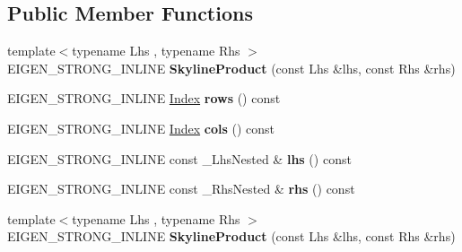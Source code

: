 \subsection*{Public Member Functions}
\begin{DoxyCompactItemize}
\item 
\mbox{\label{class_eigen_1_1internal_1_1_skyline_product_aa4773b15b610d5410545a055c3f5d767}} 
{\footnotesize template$<$typename Lhs , typename Rhs $>$ }\\E\+I\+G\+E\+N\+\_\+\+S\+T\+R\+O\+N\+G\+\_\+\+I\+N\+L\+I\+NE {\bfseries Skyline\+Product} (const Lhs \&lhs, const Rhs \&rhs)
\item 
\mbox{\label{class_eigen_1_1internal_1_1_skyline_product_a0343228278bf1d88bf6c60e913aaa581}} 
E\+I\+G\+E\+N\+\_\+\+S\+T\+R\+O\+N\+G\+\_\+\+I\+N\+L\+I\+NE \hyperlink{namespace_eigen_a62e77e0933482dafde8fe197d9a2cfde}{Index} {\bfseries rows} () const
\item 
\mbox{\label{class_eigen_1_1internal_1_1_skyline_product_a24f6dc6ce8c91000313bf2dc25fa59cc}} 
E\+I\+G\+E\+N\+\_\+\+S\+T\+R\+O\+N\+G\+\_\+\+I\+N\+L\+I\+NE \hyperlink{namespace_eigen_a62e77e0933482dafde8fe197d9a2cfde}{Index} {\bfseries cols} () const
\item 
\mbox{\label{class_eigen_1_1internal_1_1_skyline_product_a76802d63b2c608d33dcfa0c658b2e5c5}} 
E\+I\+G\+E\+N\+\_\+\+S\+T\+R\+O\+N\+G\+\_\+\+I\+N\+L\+I\+NE const \+\_\+\+Lhs\+Nested \& {\bfseries lhs} () const
\item 
\mbox{\label{class_eigen_1_1internal_1_1_skyline_product_a095e8ca49146cada39c54164294e1e82}} 
E\+I\+G\+E\+N\+\_\+\+S\+T\+R\+O\+N\+G\+\_\+\+I\+N\+L\+I\+NE const \+\_\+\+Rhs\+Nested \& {\bfseries rhs} () const
\item 
\mbox{\label{class_eigen_1_1internal_1_1_skyline_product_aa4773b15b610d5410545a055c3f5d767}} 
{\footnotesize template$<$typename Lhs , typename Rhs $>$ }\\E\+I\+G\+E\+N\+\_\+\+S\+T\+R\+O\+N\+G\+\_\+\+I\+N\+L\+I\+NE {\bfseries Skyline\+Product} (const Lhs \&lhs, const Rhs \&rhs)

\end{DoxyCompactItemize}
